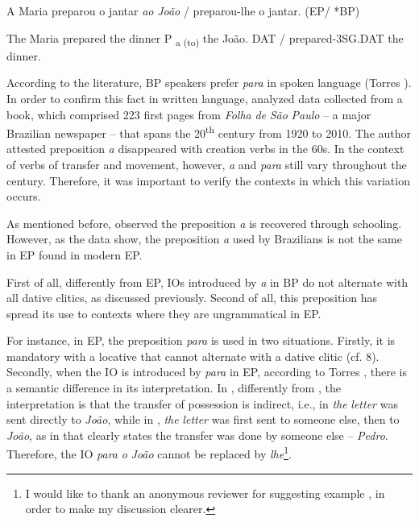 \documentclass[output=paper,modfonts,nonflat]{langsci/langscibook}
\begin{document}
          A   Maria preparou o jantar     \textit{ao} \textit{João} / preparou-lhe o jantar.      (EP/ *BP)    

\begin{styleBodyTextii}
          The Maria prepared  the dinner  P\textsubscript{ a (to)} the João. DAT / prepared-3SG.DAT the dinner. 
\end{styleBodyTextii}

According to the literature, BP speakers prefer \textit{para} in spoken language (Torres \citealt{MoraisBerlinck2007}). In order to confirm this fact in written language, \citet{Calindro2015} analyzed data collected from a book, which comprised 223 first pages from \textit{Folha} \textit{de} \textit{São} \textit{Paulo} – a major Brazilian newspaper – that spans the 20\textsuperscript{th} century from 1920 to 2010. The author attested preposition \textit{a} disappeared with creation verbs in the 60s. In the context of verbs of transfer and movement, however, \textit{a} and \textit{para} still vary throughout the century. Therefore, it was important to verify the contexts in which this variation occurs.

As mentioned before, \citet{Kato2005} observed the preposition \textit{a} is recovered through schooling. However, as the data show, the preposition \textit{a} used by Brazilians is not the same in EP found in modern EP. 

First of all, differently from EP, IOs introduced by \textit{a} in BP do not alternate with all dative clitics, as discussed previously. Second of all, this preposition has spread its use to contexts where they are ungrammatical in EP.

For instance, in EP, the preposition \textit{para} is used in two situations. Firstly, it is mandatory with a locative that cannot alternate with a dative clitic (cf. 8). Secondly, when the IO is introduced by \textit{para} in EP, according to Torres \citet{Morais2007}, there is a semantic difference in its interpretation. In , differently from , the interpretation is that the transfer of possession is indirect, i.e., in  \textit{the} \textit{letter} was sent directly to \textit{João}, while in , \textit{the} \textit{letter} was first sent to someone else, then to \textit{João}, as in  that clearly states the transfer was done by someone else – \textit{Pedro}. Therefore, the IO \textit{para} \textit{o} \textit{João} cannot be replaced by \textit{lhe}\footnote{ \textrm{I would like to thank an anonymous reviewer for suggesting example , in order to make my discussion clearer.}}.
\end{document}
